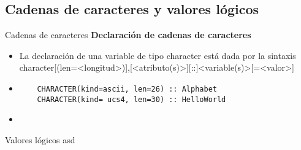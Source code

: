 
\subsection{Cadenas de caracteres y valores lógicos}

\begin{frame}[fragile]{Cadenas de caracteres}
\textbf{Declaración de cadenas de caracteres}
 \begin{itemize}[<+(0)->]
  \item La declaración de una variable de tipo character está dada por la sintaxis\\ 
   \centering character[(len=<longitud>)],[<atributo(s)>][::]<variable(s)>[=<valor>]
  \vspace{6pt}
  \item []
   \begin{verbatim}
    CHARACTER(kind=ascii, len=26) :: Alphabet
    CHARACTER(kind= ucs4, len=30) :: HelloWorld
   \end{verbatim}
  \item[] 
 \end{itemize}
\end{frame}

\begin{frame}[fragile]{Valores lógicos}
 asd
\end{frame}
